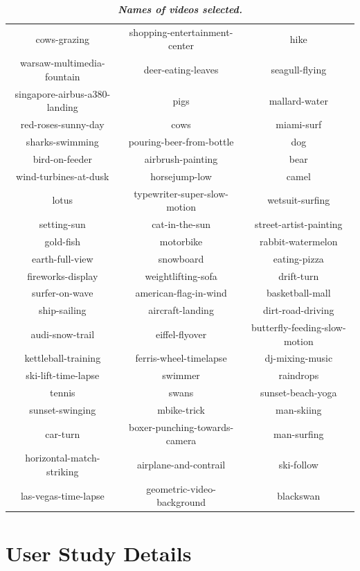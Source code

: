 \documentclass{article}
\begin{document}
\begin{table}[h]
\centering
\caption{\textit{\textbf{Names of videos selected.}}}
\label{tab:dataset}
\begin{tabular}{|c|c|c|}
\hline
cows-grazing &  shopping-entertainment-center &  hike \\
warsaw-multimedia-fountain &  deer-eating-leaves &  seagull-flying \\
singapore-airbus-a380-landing &  pigs &  mallard-water \\
red-roses-sunny-day &  cows &  miami-surf \\
sharks-swimming &  pouring-beer-from-bottle &  dog \\
bird-on-feeder &  airbrush-painting &  bear \\
wind-turbines-at-dusk &  horsejump-low &  camel \\
lotus &  typewriter-super-slow-motion &  wetsuit-surfing \\
setting-sun &  cat-in-the-sun &  street-artist-painting \\
gold-fish &  motorbike &  rabbit-watermelon \\
earth-full-view &  snowboard &  eating-pizza \\
fireworks-display &  weightlifting-sofa &  drift-turn \\
surfer-on-wave &  american-flag-in-wind &  basketball-mall \\
ship-sailing &  aircraft-landing &  dirt-road-driving \\
audi-snow-trail &  eiffel-flyover &  butterfly-feeding-slow-motion \\
kettleball-training &  ferris-wheel-timelapse &  dj-mixing-music \\
ski-lift-time-lapse &  swimmer &  raindrops \\
tennis &  swans &  sunset-beach-yoga \\
sunset-swinging &  mbike-trick &  man-skiing \\
car-turn &  boxer-punching-towards-camera &  man-surfing \\
horizontal-match-striking &  airplane-and-contrail &  ski-follow \\
las-vegas-time-lapse &  geometric-video-background &  blackswan \\
\hline
\end{tabular}
\end{table}

\section{User Study Details}\label{sec:user study details}
\end{document}
